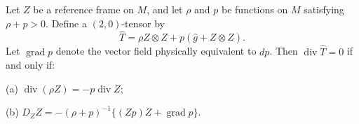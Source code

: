 Let $Z$ be a reference frame on $M$, and let $\rho$ and $p$ be functions on $M$ satisfying $\rho + p > 0$. Define a $(2,0)$-tensor by
$$\hat{T} = \rho Z \otimes Z + p(\hat{g} + Z \otimes Z).$$
Let $\operatorname{grad} p$ denote the vector field physically equivalent to $dp$. Then $\operatorname{div} \hat{T} = 0$ if and only if:

(a) $\operatorname{div}(\rho Z) = -p \operatorname{div} Z$;

(b) $D_Z Z = -(\rho + p)^{-1}\{(Zp)Z + \operatorname{grad} p\}$.
